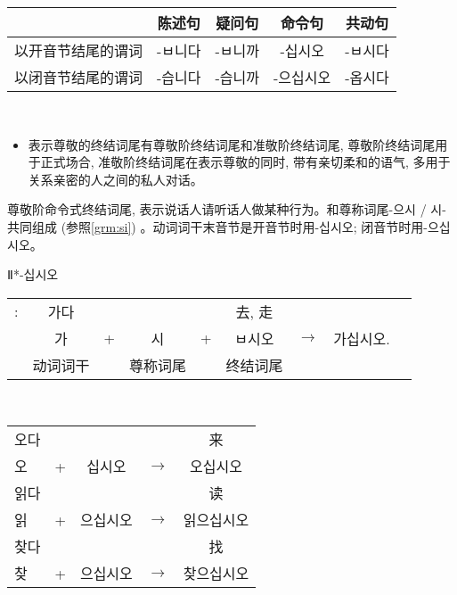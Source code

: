 \begin{grammar}
\begin{grammarsect}[尊敬阶终结词尾]
\begin{tabular}{|c|c|c|c|c|}
			\diagbox{谓词类型}{句子类型} & 陈述句      & 疑问句      & 命令句       & 共动句      \\\hline
			以开音节结尾的谓词            & \kr -ㅂ니다 & \kr -ㅂ니까 & \kr -십시오  & \kr -ㅂ시다 \\\hline
			以闭音节结尾的谓词            & \kr -습니다 & \kr -습니까 & \kr -으십시오 & \kr -옵시다 \\\hline
		\end{tabular}\\
		\begin{itemize}
			\item 表示尊敬的终结词尾有尊敬阶终结词尾和准敬阶终结词尾, 尊敬阶终结词尾用于正式场合, 准敬阶终结词尾在表示尊敬的同时, 带有亲切柔和的语气, 多用于关系亲密的人之间的私人对话。
		\end{itemize}
	\end{grammarsect}
	\begin{grammarsect}[\kr -ㅂ시오]\label{grm:bsio}
		\begin{itemize}
			\item 尊敬阶命令式终结词尾, 表示说话人请听话人做某种行为。和尊称词尾{\kr -으시 / 시-}共同组成 (参照\ref{grm:si}) 。动词词干末音节是开音节时用-십시오;
			      闭音节时用{\kr -으십시오}。
			      {\color{gray} \item Ⅱ*{\kr -십시오}}
		\end{itemize}
		\begin{tabular}{ccccccccc}
			\kr \ruby{例}{예}: & \kr 가다 &   &       &   & 去, 走                        \\
			                 & \kr 가  & + & \kr 시 & + & \kr ㅂ시오 & $\to$ & \kr 가십시오. \\\cline{2-2}\cline{4-4}\cline{6-6}
			                 & 动词词干   &   & 尊称词尾  &   & 终结词尾
		\end{tabular}\\
		\begin{tabular}{lcccc}
			\kr 오다 &   &          &       & 来         \\
			\kr 오  & + & \kr 십시오  & $\to$ & \kr 오십시오  \\
			\kr 읽다 &   &          &       & 读         \\
			\kr 읽  & + & \kr 으십시오 & $\to$ & \kr 읽으십시오 \\
			\kr 찾다 &   &          &       & 找         \\
			\kr 찾  & + & \kr 으십시오 & $\to$ & \kr 찾으십시오
		\end{tabular}\\

\end{grammarsect}
\end{grammar}
